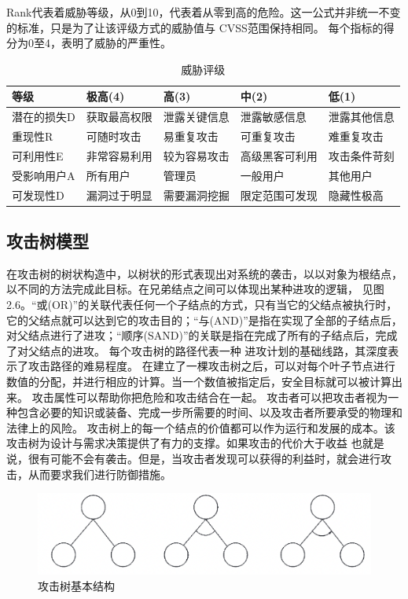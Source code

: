 Rank代表着威胁等级，从0到10，代表着从零到高的危险。这一公式并非统一不变的标准，只是为了让该评级方式的威胁值与 CVSS范围保持相同。
每个指标的得分为0至4，表明了威胁的严重性。

\begin{table}
  \caption{威胁评级}
\begin{center}
  \begin{tabular}{|l|l|l|l|l|}
    \hline 等级 & 极高(4) & 高(3) & 中(2) & 低(1) \\
    \hline 潜在的损失D & 获取最高权限 & 泄露关键信息 & 泄露敏感信息 & 泄露其他信息 \\
    \hline 重现性R & 可随时攻击 & 易重复攻击 & 可重复攻击 & 难重复攻击 \\
    \hline 可利用性E & 非常容易利用 & 较为容易攻击 & 高级黑客可利用 & 攻击条件苛刻 \\
    \hline 受影响用户A & 所有用户 & 管理员 & 一般用户 & 其他用户 \\
    \hline 可发现性D & 漏洞过于明显 & 需要漏洞挖掘 & 限定范围可发现 & 隐藏性极高 \\
    \hline
    \end{tabular}
\end{center}
\end{table}

\subsection{攻击树模型}
在攻击树的树状构造中，以树状的形式表现出对系统的袭击，以以对象为根结点，以不同的方法完成此目标。在兄弟结点之间可以体现出某种进攻的逻辑，
见图2.6。“或(OR)”的关联代表任何一个子结点的方式，只有当它的父结点被执行时，
它的父结点就可以达到它的攻击目的；“与(AND)”是指在实现了全部的子结点后，对父结点进行了进攻；“顺序(SAND)”的关联是指在完成了所有的子结点后，完成了对父结点的进攻。
每个攻击树的路径代表一种
进攻计划的基础线路，其深度表示了攻击路径的难易程度。
在建立了一棵攻击树之后，可以对每个叶子节点进行数值的分配，并进行相应的计算。当一个数值被指定后，安全目标就可以被计算出来。
攻击属性可以帮助你把危险和攻击结合在一起。
攻击者可以把攻击者视为一种包含必要的知识或装备、完成一步所需要的时间、以及攻击者所要承受的物理和法律上的风险。
攻击树上的每一个结点的价值都可以作为运行和发展的成本。该攻击树为设计与需求决策提供了有力的支撑。如果攻击的代价大于收益
也就是说，很有可能不会有袭击。但是，当攻击者发现可以获得的利益时，就会进行攻击，从而要求我们进行防御措施。

\begin{figure}
    \centering
    \includegraphics[scale=0.6]{resources/img/i8.png}
    \caption{攻击树基本结构}
  \end{figure}



